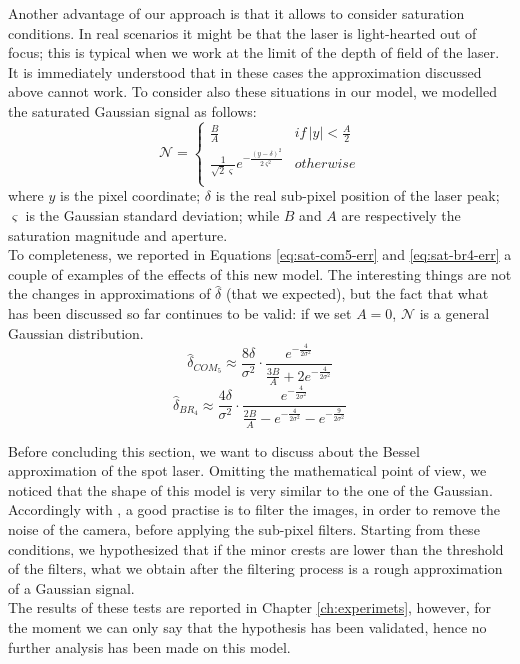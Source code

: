 Another advantage of our approach is that it allows to consider saturation conditions. In real scenarios it might be that the laser is light-hearted out of focus; this is typical when we work at the limit of the depth of field of the laser. It is immediately understood that in these cases the approximation discussed above cannot work. To consider also these situations in our model, we modelled the saturated Gaussian signal as follows:
  \begin{equation*}
    \mathcal{N} = \left\{
      \begin{matrix}
        \frac{B}{A} & if \, |y| < \frac{A}{2} \\ 
        \frac{1}{\sqrt{2}\varsigma} e^{ - \frac{ (y - \delta )^2}{2\varsigma^2} } & otherwise \\
      \end{matrix}
    \right.
  \end{equation*}
where $y$ is the pixel coordinate; $\delta$ is the real sub-pixel position of the laser peak; $\varsigma$ is the Gaussian standard deviation; while $B$ and $A$ are respectively the saturation magnitude and aperture. \\
To completeness, we reported in Equations \ref{eq:sat-com5-err} and \ref{eq:sat-br4-err} a couple of examples of the effects of this new model. The interesting things are not the changes in approximations of $\hat{\delta}$ (that we expected), but the fact that what has been discussed so far continues to be valid: if we set $A = 0$, $\mathcal{N}$ is a general Gaussian distribution.
  \begin{equation}
    \hat{\delta}_{COM_5} \approx
    \frac{8\delta}{\sigma^2} \cdot \frac{
      e^{-\frac{4}{2\sigma^2}}
    }{
      \frac{3B}{A} + 2e^{-\frac{4}{2\sigma^2}}
    }
    \label{eq:sat-com5-err}
  \end{equation}
  \begin{equation}
    \hat{\delta}_{BR_4} \approx \frac{4\delta}{\sigma^2} \cdot \frac{
      e^{-\frac{4}{2\sigma^2}}
    }{
      \frac{2B}{A} -
      e^{-\frac{4}{2\sigma^2}} -
      e^{-\frac{9}{2\sigma^2}}
    }
    \label{eq:sat-br4-err}
  \end{equation}

\bigskip
Before concluding this section, we want to discuss about the Bessel approximation of the spot laser. Omitting the mathematical point of view, we noticed that the shape of this model is very similar to the one of the Gaussian. Accordingly with \cite{Naidu1991}, a good practise is to filter the images, in order to remove the noise of the camera, before applying the sub-pixel filters. Starting from these conditions, we hypothesized that if the minor crests are lower than the threshold of the filters, what we obtain after the filtering process is a rough approximation of a Gaussian signal. \\
The results of these tests are reported in Chapter \ref{ch:experimets}, however, for the moment we can only say that the hypothesis has been validated, hence no further analysis has been made on this model.
